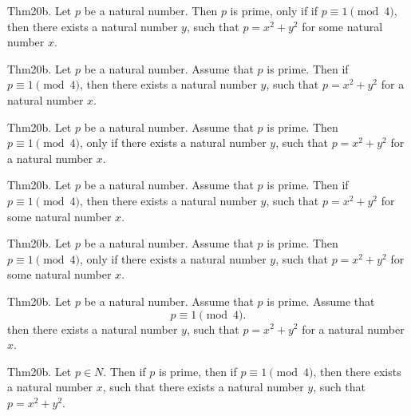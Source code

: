 \documentclass{article}
\begin{document}
Thm20b. Let $p$ be a natural number. Then $p$ is prime, only if if $p \equiv 1 \pmod{ 4}$, then there exists a natural number $y$, such that $p = x ^{ 2}+ y ^{ 2}$ for some natural number $x$.

Thm20b. Let $p$ be a natural number. Assume that $p$ is prime. Then if $p \equiv 1 \pmod{ 4}$, then there exists a natural number $y$, such that $p = x ^{ 2}+ y ^{ 2}$ for a natural number $x$.

Thm20b. Let $p$ be a natural number. Assume that $p$ is prime. Then $p \equiv 1 \pmod{ 4}$, only if there exists a natural number $y$, such that $p = x ^{ 2}+ y ^{ 2}$ for a natural number $x$.

Thm20b. Let $p$ be a natural number. Assume that $p$ is prime. Then if $p \equiv 1 \pmod{ 4}$, then there exists a natural number $y$, such that $p = x ^{ 2}+ y ^{ 2}$ for some natural number $x$.

Thm20b. Let $p$ be a natural number. Assume that $p$ is prime. Then $p \equiv 1 \pmod{ 4}$, only if there exists a natural number $y$, such that $p = x ^{ 2}+ y ^{ 2}$ for some natural number $x$.

Thm20b. Let $p$ be a natural number. Assume that $p$ is prime. Assume that $$p \equiv 1 \pmod{ 4}.$$ then there exists a natural number $y$, such that $p = x ^{ 2}+ y ^{ 2}$ for a natural number $x$.

Thm20b. Let $p \in N$. Then if $p$ is prime, then if $p \equiv 1 \pmod{ 4}$, then there exists a natural number $x$, such that there exists a natural number $y$, such that $p = x ^{ 2}+ y ^{ 2}$.
\end{document}
